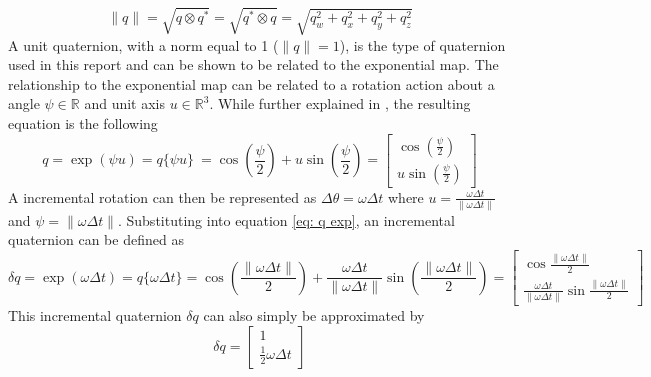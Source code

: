 \begin{equation}
    \|q\| = \sqrt{q \otimes q^*} = \sqrt{q^* \otimes q} = \sqrt{q_w^2 + q_x^2 + q_y^2 + q_z^2}
    \label{eq: quaterion conjugate property}
\end{equation}
A unit quaternion, with a norm equal to 1 ($\|q\| = 1$), is the type of quaternion used in this report and can be shown to be related to the exponential map. The relationship to the exponential map can be related to a rotation action about a angle $\psi \in \mathbb{R}$ and unit axis $u \in \mathbb{R}^3$. While further explained in \cite{Quaternion_Kinematics_for_the_Error-state_EKF}, the resulting equation is the following
\begin{equation}
    q = \exp{(\psi u)} = q\{ \psi u \}\ = \cos{(\frac{\psi}{2})} + u \sin{(\frac{\psi}{2})} = \begin{bmatrix}
                \cos{(\frac{\psi}{2})} \\
                u \sin{(\frac{\psi}{2})}
            \end{bmatrix} 
    \label{eq: q exp}
\end{equation}
A incremental rotation can then be represented as $\Delta \theta = \omega \Delta t$ where $u = \frac{\omega \Delta t}{\| \omega \Delta t\|}$ and $\psi = \| \omega \Delta t\|$. Substituting into equation \eqref{eq: q exp}, an incremental quaternion can be defined as
\begin{equation}
    \delta q = \exp{(\omega \Delta t)} = q\{\omega \Delta t\} = \cos{(\frac{\| \omega \Delta t\|}{2})} +             \frac{\omega \Delta t}{\| \omega \Delta t\|} \sin{(\frac{\| \omega \Delta t\|}{2})} 
    = \begin{bmatrix}
                \cos{\frac{\| \omega \Delta t\|}{2}} \\
                \frac{\omega \Delta t}{\| \omega \Delta t\|} \sin{\frac{\| \omega \Delta t\|}{2}}
            \end{bmatrix} 
    \label{eq: q exp with omega delta t}
\end{equation}
This incremental quaternion $\delta q$ can also simply be approximated by \cite{Quaternion_Kinematics_for_the_Error-state_EKF}
\begin{equation}
    \delta q = \begin{bmatrix}
        1\\
        \frac{1}{2} \omega \Delta t
    \end{bmatrix}
    \label{eq: delta q approx}
\end{equation}

